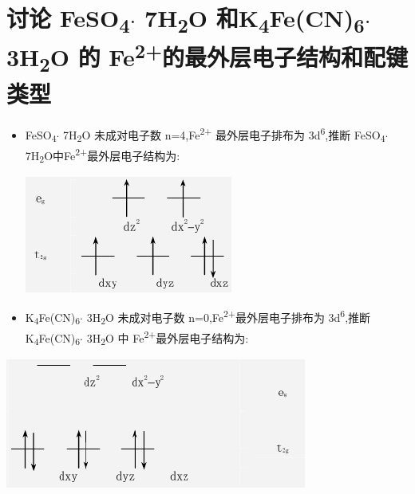 \documentclass[11pt]{report}
\begin{document}
\section{讨论 FeSO\textsubscript{4}\(\cdot\) 7H\textsubscript{2}O 和K\textsubscript{4}Fe(CN)\textsubscript{6}\(\cdot\) 3H\textsubscript{2}O 的 Fe\textsuperscript{2+}的最外层电子结构和配键类型}
\label{sec:org7a0cbfe}
\begin{itemize}
\item FeSO\textsubscript{4}\(\cdot\) 7H\textsubscript{2}O 未成对电子数 n=4,Fe\textsuperscript{2+} 最外层电子排布为 3d\textsuperscript{6},推断 FeSO\textsubscript{4}\(\cdot\) 7H\textsubscript{2}O中Fe\textsuperscript{2+}最外层电子结构为:
\begin{center}
\includegraphics[width=.9\linewidth]{../img/3.png}
\end{center}
\item K\textsubscript{4}Fe(CN)\textsubscript{6}\(\cdot\) 3H\textsubscript{2}O 未成对电子数 n=0,Fe\textsuperscript{2+}最外层电子排布为 3d\textsuperscript{6},推断 K\textsubscript{4}Fe(CN)\textsubscript{6}\(\cdot\) 3H\textsubscript{2}O 中 Fe\textsuperscript{2+}最外层电子结构为:
\end{itemize}
\begin{center}
\includegraphics[width=.9\linewidth]{../img/4.png}
\end{center}
\end{document}
